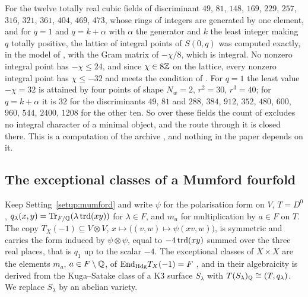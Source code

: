 \begin{remark}\label{rem:sexticfields}
For the twelve totally real cubic fields of discriminant $49$, $81$, $148$, $169$, $229$, $257$, $316$, $321$, $361$, $404$, $469$, $473$, whose rings of integers are generated by one element, and for $q=1$ and $q=k+\alpha$ with $\alpha$ the generator and $k$ the least integer making $q$ totally positive, the lattice of integral points of $S(0,q)$ was computed exactly, in the model of \cite[Prop.~19.49]{BMB26}, with the Gram matrix of $-\chi/8$, which is integral. No nonzero integral point has $-\chi\le24$, and since $\chi\in8\mathbb{Z}$ on the lattice, every nonzero integral point has $\chi\le-32$ and meets the condition of \cite[Prop.~19.47(iii)]{BMB26}. For $q=1$ the least value $-\chi=32$ is attained by four points of shape $N_{w}=2$, $r^{2}=30$, $r^{3}=40$; for $q=k+\alpha$ it is $32$ for the discriminants $49$, $81$ and $288$, $384$, $912$, $352$, $480$, $600$, $960$, $544$, $2400$, $1208$ for the other ten. So over these fields the count of \cite[Prop.~19.47]{BMB26} excludes no integral character of a minimal object, and the route through it is closed there. This is a computation of the archive \cite{BB26code}, and nothing in the paper depends on it.
\end{remark}

\subsection{The exceptional classes of a Mumford fourfold}\label{ssec:mumford}

Keep Setting~\ref{setup:mumford} and write $\psi$ for the polarisation form on $V$, $T=D^{0}$, $q_{\lambda}(x,y)=\mathrm{Tr}_{F/\mathbb{Q}}(\lambda\,\mathrm{trd}(xy))$ for $\lambda\in F$, and $m_{a}$ for multiplication by $a\in F$ on $T$. The copy $T_{X}(-1)\subseteq V\otimes V$, $x\mapsto\bigl((v,w)\mapsto\psi(xv,w)\bigr)$, is symmetric and carries the form induced by $\psi\otimes\psi$, equal to $-4\,\mathrm{trd}(xy)$ summed over the three real places, that is $q_{1}$ up to the scalar $-4$. The exceptional classes of $X\times X$ are the elements $m_{a}$, $a\in F\setminus\mathbb{Q}$, of $\mathrm{End}_{\mathrm{Hdg}}T_{X}(-1)=F$ \cite[Prop.~21.2]{BMB26}, and in \cite[Thm.~21.4]{BMB26} their algebraicity is derived from the Kuga--Satake class of a K3 surface $S_{\lambda}$ with $T(S_{\lambda})_{\mathbb{Q}}\cong(T,q_{\lambda})$. We replace $S_{\lambda}$ by an abelian variety.

